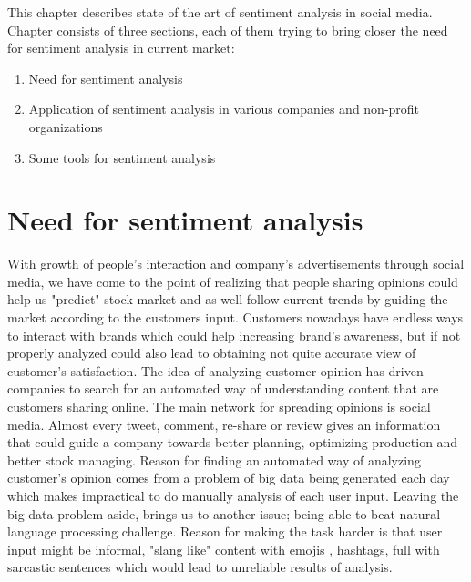 This chapter describes state of the art of sentiment analysis in social media.
Chapter consists of three sections, each of them trying to bring closer the need for sentiment analysis in current market:

\begin{enumerate}
	\item Need for sentiment analysis
	\item Application of sentiment analysis in various companies and non-profit organizations
	\item Some tools for sentiment analysis
\end{enumerate}

\section{Need for sentiment analysis}
With growth of people's interaction and company's advertisements through social media, we have come to the point of realizing that people sharing opinions could help us "predict" stock market and as well follow current trends by guiding the market according to the customers input.
Customers nowadays have endless ways to interact with brands which could help increasing brand's awareness, but if not properly analyzed could also lead to obtaining not quite accurate view of customer's satisfaction.
The idea of analyzing customer opinion has driven companies to search for an automated way of understanding content that are customers sharing online. The main network for spreading opinions is social media. Almost every tweet, comment, re-share or  review gives an information that could guide a company towards better planning, optimizing production and better stock managing.
Reason for finding an automated way of analyzing customer's opinion comes from a problem of big data being generated each day which makes impractical to do manually analysis of each user input. Leaving the big data problem aside, brings us to another issue; being able to beat natural language processing challenge. Reason for making the task harder is that user input might be informal, "slang like" content with emojis , hashtags, full with sarcastic sentences which would lead to unreliable results of analysis.

